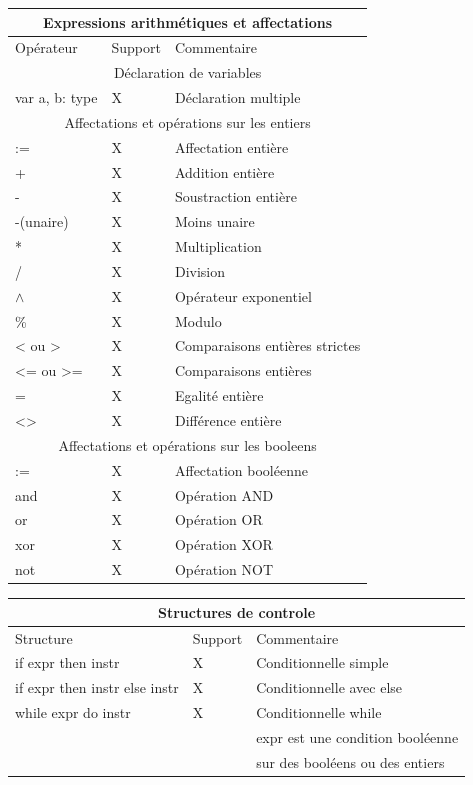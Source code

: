 \documentclass[a4paper]{article}
\begin{document}
\begin{center}
\begin{tabular}{|l|l|l|}
  \hline
  \multicolumn{3}{|c|}{Expressions arithmétiques et affectations} \\
  \hline
  Opérateur & Support & Commentaire \\
  \hline
  \multicolumn{3}{|c|}{Déclaration de variables} \\
  \hline
  var a, b: type & X & Déclaration multiple \\
  \hline
  \multicolumn{3}{|c|}{Affectations et opérations sur les entiers} \\
  \hline
  := & X & Affectation entière\\
  + & X & Addition entière \\
  - & X & Soustraction entière \\
  -(unaire) & X & Moins unaire \\
  * & X & Multiplication \\
  / & X & Division \\
  $\wedge$ & X & Opérateur exponentiel \\
  \% & X & Modulo \\
  < ou > & X & Comparaisons entières strictes \\
  <= ou >= & X & Comparaisons entières \\
  = & X & Egalité entière \\
  <> & X & Différence entière \\
  \hline
  \multicolumn{3}{|c|}{Affectations et opérations sur les booleens} \\
  \hline
  := & X & Affectation booléenne \\
  and & X & Opération AND \\
  or & X & Opération OR \\
  xor & X & Opération XOR \\
  not & X & Opération NOT \\
  \hline
\end{tabular}

\begin{tabular}{|l|l|l|}
  \hline
  \multicolumn{3}{|c|}{Structures de controle} \\
  \hline
  Structure & Support & Commentaire \\
  \hline
  if expr then instr & X & Conditionnelle simple \\
  if expr then instr else instr & X & Conditionnelle avec else \\
  while expr do instr & X & Conditionnelle while \\
  & & expr est une condition booléenne \\
  & & sur des booléens ou des entiers \\
  \hline
\end{tabular}



\end{center}
\end{document}
